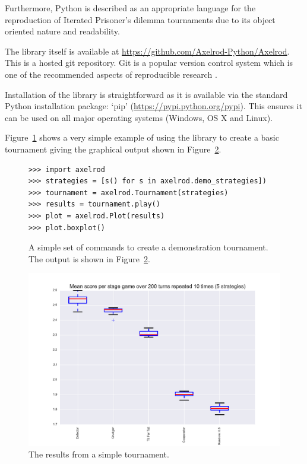 \documentclass{article}
\begin{document}
Furthermore, \cite{Isaac2008} Python is described as an appropriate language for the
reproduction of Iterated Prisoner's dilemma tournaments due to its object
oriented nature and readability.

The library itself is available at
\url{https://github.com/Axelrod-Python/Axelrod}. This is a hosted git
repository. Git is a popular version control system which is one of the
recommended aspects of reproducible research \cite{Crick2014a, Sandve2013}.

Installation of the library is straightforward as it is available via the
standard Python installation package: `pip'
(\url{https://pypi.python.org/pypi}). This ensures it can be used on all major
operating systems (Windows, OS X and Linux).

Figure~\ref{fig:demo_tournament_commands} shows a very simple example of using
the library to create a basic tournament giving the graphical output shown in
Figure~\ref{fig:demo_tournament}.

\begin{figure}[!hbtp]
    \begin{lstlisting}[frame=single]
>>> import axelrod
>>> strategies = [s() for s in axelrod.demo_strategies])
>>> tournament = axelrod.Tournament(strategies)
>>> results = tournament.play()
>>> plot = axelrod.Plot(results)
>>> plot.boxplot()
    \end{lstlisting}
    \caption{A simple set of commands to create a demonstration tournament. The
        output is shown in Figure~\ref{fig:demo_tournament}.}
    \label{fig:demo_tournament_commands}
\end{figure}

\begin{figure}[!hbtp]
    \centering
    \includegraphics[width=.8\textwidth]{../img/demo_tournament.pdf}
    \caption{The results from a simple tournament.}
    \label{fig:demo_tournament}
\end{figure}
\end{document}
